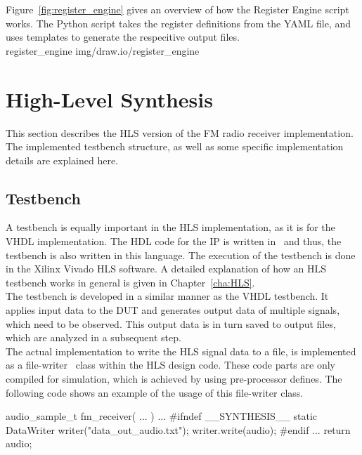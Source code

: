 Figure~\ref{fig:register_engine} gives an overview of how the Register Engine script works.
The Python script takes the register definitions from the YAML file, and uses templates to generate the respecitive output files.\\

 {register_engine} {img/draw.io/register_engine}


\section{High-Level Synthesis}

This section describes the HLS version of the FM radio receiver implementation.
The implemented testbench structure, as well as some specific implementation details are explained here.

\subsection{Testbench}
\label{sec:impl:hls:testbench}

A testbench is equally important in the HLS implementation, as it is for the VHDL implementation.
The HDL code for the IP is written in \cplusplus\ and thus, the testbench is also written in this language.
The execution of the testbench is done in the Xilinx Vivado HLS software.
A detailed explanation of how an HLS testbench works in general is given in Chapter~\ref{cha:HLS}.\\

The testbench is developed in a similar manner as the VHDL testbench.
It applies input data to the DUT and generates output data of multiple signals, which need to be observed.
This output data is in turn saved to output files, which are analyzed in a subsequent step.\\

The actual implementation to write the HLS signal data to a file, is implemented as a file-writer \cplusplus\ class within the HLS design code.
These code parts are only compiled for simulation, which is achieved by using pre-processor defines.
The following code shows an example of the usage of this file-writer class.\\

\begin{CppCode}
audio_sample_t fm_receiver( ... ) {
  ...
#ifndef __SYNTHESIS__
  static DataWriter writer("data_out_audio.txt");
  writer.write(audio);
#endif
  ...
  return audio;
}
\end{CppCode}


